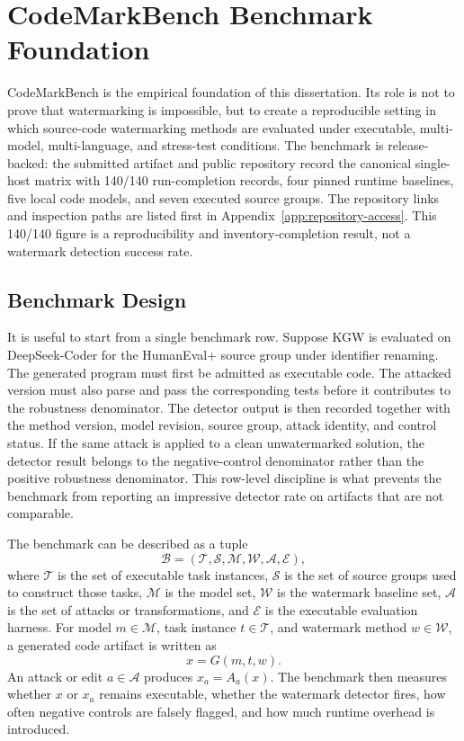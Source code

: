 \chapter{CodeMarkBench Benchmark Foundation}\label{cpt:codemarkbench}

CodeMarkBench is the empirical foundation of this dissertation. Its role is not to prove that watermarking is impossible, but to create a reproducible setting in which source-code watermarking methods are evaluated under executable, multi-model, multi-language, and stress-test conditions. The benchmark is release-backed: the submitted artifact and public repository record the canonical single-host matrix with 140/140 run-completion records, four pinned runtime baselines, five local code models, and seven executed source groups. The repository links and inspection paths are listed first in Appendix~\ref{app:repository-access}. This 140/140 figure is a reproducibility and inventory-completion result, not a watermark detection success rate.

\section{Benchmark Design}

It is useful to start from a single benchmark row. Suppose KGW is evaluated on DeepSeek-Coder for the HumanEval+ source group under identifier renaming. The generated program must first be admitted as executable code. The attacked version must also parse and pass the corresponding tests before it contributes to the robustness denominator. The detector output is then recorded together with the method version, model revision, source group, attack identity, and control status. If the same attack is applied to a clean unwatermarked solution, the detector result belongs to the negative-control denominator rather than the positive robustness denominator. This row-level discipline is what prevents the benchmark from reporting an impressive detector rate on artifacts that are not comparable.

The benchmark can be described as a tuple
\begin{equation}
  \mathcal{B} = (\mathcal{T}, \mathcal{S}, \mathcal{M}, \mathcal{W}, \mathcal{A}, \mathcal{E}),
  \label{eq:benchmark-tuple}
\end{equation}
where $\mathcal{T}$ is the set of executable task instances, $\mathcal{S}$ is the set of source groups used to construct those tasks, $\mathcal{M}$ is the model set, $\mathcal{W}$ is the watermark baseline set, $\mathcal{A}$ is the set of attacks or transformations, and $\mathcal{E}$ is the executable evaluation harness. For model $m \in \mathcal{M}$, task instance $t \in \mathcal{T}$, and watermark method $w \in \mathcal{W}$, a generated code artifact is written as
\begin{equation}
  x = G(m,t,w).
\end{equation}
An attack or edit $a \in \mathcal{A}$ produces $x_a = A_a(x)$. The benchmark then measures whether $x$ or $x_a$ remains executable, whether the watermark detector fires, how often negative controls are falsely flagged, and how much runtime overhead is introduced.

